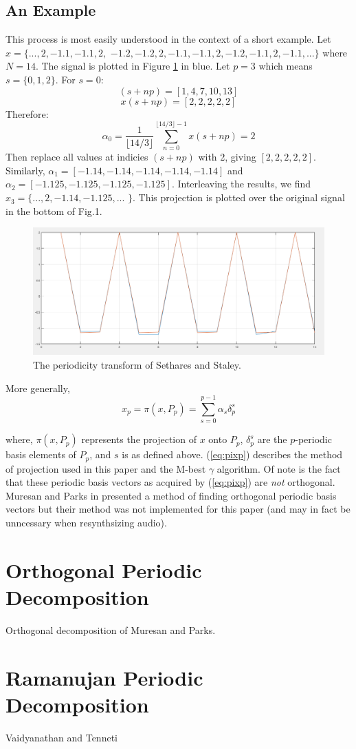     \subsection{An Example}
    This process is most easily understood in the context of a short example. Let $x = \{ ... , 2, -1.1, -1.1, 2,$
    $-1.2, -1.2, 2, -1.1, -1.1, 2, -1.2, -1.1, 2, -1.1,...\}$ where $N = 14$. The signal is plotted in Figure \ref{fig:firstSig_proj} in blue. Let $p = 3$ which means $s = \{0,1,2\}$. For $s=0$:
    $$
    (s + np) = [1, 4, 7, 10, 13]
    $$
    $$
    x(s + np) = [2,2,2,2,2]
    $$
    Therefore:
    $$
    \alpha_0 = \frac{1}{\lfloor 14/3 \rfloor} \sum_{n=0}^{\lfloor 14/3 \rfloor -1} x(s + np) = 2
    $$
    Then replace all values at indicies $(s+np)$ with 2, giving $[2,2,2,2,2]$. Similarly, $\alpha_1 = [-1.14,-1.14,-1.14,-1.14, -1.14]$ and $\alpha_2 = [-1.125,-1.125,-1.125,-1.125]$. Interleaving the results, we find $x_3 = \{..., 2, -1.14, -1.125,...$
    $\}$. This projection is plotted over the original signal in the bottom of Fig.1.

    \begin{figure}[h]
      \centering
      \includegraphics[width=1\textwidth]{chapters/01/figs/firstSig_proj.png}
      \caption[Sethares and Staley's periodicity transform overlayed.]
    {The periodicity transform of Sethares and Staley. }
      \label{fig:firstSig_proj}
    \end{figure}

    More generally,
    \begin{equation} \label{eq:pixp}
      x_p = \pi(x, P_p) = \sum_{s=0}^{p-1} \alpha_s \delta_p^s
    \end{equation}

    where, $\pi(x, P_p)$ represents the projection of $x$ onto $P_p$, $\delta_p^s$ are the $p$-periodic basis elements of $P_p$, and $s$ is as defined above. (\ref{eq:pixp}) describes the method of projection used in this paper and the M-best $\gamma$ algorithm. Of note is the fact that these periodic basis vectors as acquired by (\ref{eq:pixp}) are \emph{not} orthogonal. Muresan and Parks in \cite{muresan2003orthogonal} presented a method of finding orthogonal periodic basis vectors but their method was not implemented for this paper (and may in fact be unncessary when resynthsizing audio).



\section{Orthogonal Periodic Decomposition}

Orthogonal decomposition of Muresan and Parks.

\section{Ramanujan Periodic Decomposition}

Vaidyanathan and Tenneti
